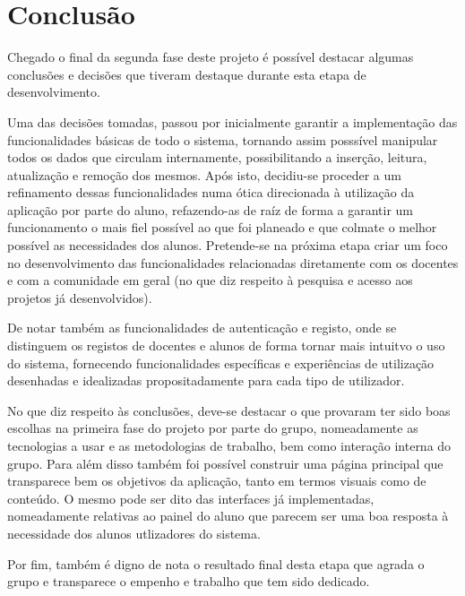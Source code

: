 \section{Conclusão}
Chegado o final da segunda fase deste projeto é possível destacar algumas conclusões e decisões que tiveram destaque durante esta etapa de desenvolvimento.

Uma das decisões tomadas, passou por inicialmente garantir a implementação das funcionalidades básicas de todo o sistema, tornando assim posssível manipular todos os dados que circulam internamente, possibilitando a inserção, leitura, atualização e remoção dos mesmos. Após isto, decidiu-se proceder a um refinamento dessas funcionalidades numa ótica direcionada à utilização da aplicação por parte do aluno, refazendo-as de raíz de forma a garantir um funcionamento o mais fiel possível ao que foi planeado e que colmate o melhor possível as necessidades dos alunos. Pretende-se na próxima etapa criar um foco no desenvolvimento das funcionalidades relacionadas diretamente com os docentes e com a comunidade em geral (no que diz respeito à pesquisa e acesso aos projetos já desenvolvidos).

De notar também as funcionalidades de autenticação e registo, onde se distinguem os registos de docentes e alunos de forma tornar mais intuitvo o uso do sistema, fornecendo funcionalidades específicas e experiências de utilização desenhadas e idealizadas propositadamente para cada tipo de utilizador.

No que diz respeito às conclusões, deve-se destacar o que provaram ter sido boas escolhas na primeira fase do projeto por parte do grupo, nomeadamente as tecnologias a usar e as metodologias de trabalho, bem como interação interna do grupo. Para além disso também foi possível construir uma página principal que transparece bem os objetivos da aplicação, tanto em termos visuais como de conteúdo. O mesmo pode ser dito das interfaces já implementadas, nomeadamente relativas ao painel do aluno que parecem ser uma boa resposta à necessidade dos alunos utlizadores do sistema. 

Por fim, também é digno de nota o resultado final desta etapa que agrada o grupo e transparece o empenho e trabalho que tem sido dedicado.


\newpage

